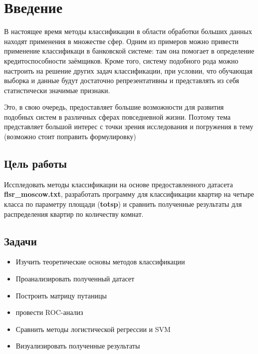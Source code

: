 \section{Введение}
В настоящее время методы классификации в области обработки больших данных находят применения в множестве сфер.
Одним из примеров можно привести применение классификаци в банковской системе: там она помогает в определение кредитоспособности заёмщиков. Кроме того, систему подобного рода можно настроить на решение других задач классификации, при условии, что обучающая выборка и данные будут достаточно репрезентативны и представлять из себя статистически значимые признаки.

Это, в свою очередь, предоставляет большие возможности для развития подобных систем в различных сферах повседневной жизни. Поэтому тема представляет большой интерес с точки зрения исследования и погружения в тему (возможно стоит поправить формулировку)

\subsection*{Цель работы}
Исспледовать методы классификации на основе предоставленного датасета \textbf{flsr\_moscow.txt}, разработать программу для классификации квартир на четыре класса по параметру площади (\textbf{totsp}) и сравнить полученные результаты для распределения квартир по количеству комнат.

\subsection*{Задачи}
\begin{itemize}
    \item Изучить теоретические основы методов классификации
    \item Проанализировать полученный датасет
    \item Построить матрицу путаницы
    \item провести ROC-анализ
    \item Сравнить методы логистической регрессии и SVM
    \item Визуализировать полученные результаты
\end{itemize}